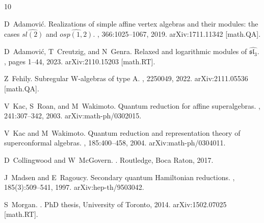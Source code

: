\documentclass[10pt,a4paper]{amsart}
\numberwithin{equation}{section}
\theoremstyle{plain}
\begin{document}


%
%


\raggedright
% 
% 
\providecommand{\opp}[2]{\textsf{arXiv:\mbox{#2}/#1}}\providecommand{\pp}[2]{\textsf{arXiv:#1
  [\mbox{#2}]}}
\begin{thebibliography}{10}

D~Adamovi\'{c}.
\newblock Realizations of simple affine vertex algebras and their modules: the
  cases $\widehat{sl(2)}$ and $\widehat{osp(1,2)}$.
, 366:1025--1067, 2019.
\newblock \pp{1711.11342}{math.QA}.

D~Adamovi\'{c}, T~Creutzig, and N~Genra.
\newblock Relaxed and logarithmic modules of $\widehat{\mathfrak{sl}_3}$.
, pages 1--44, 2023.
\newblock \pp{2110.15203}{math.RT}.

Z~Fehily.
\newblock Subregular {W}-algebras of type {A}.
, 2250049, 2022.
\newblock \pp{2111.05536}{math.QA}.

V~Kac, S~Roan, and M~Wakimoto.
\newblock Quantum reduction for affine superalgebras.
, 241:307--342, 2003.
\newblock \opp{0302015}{math-ph}.

V~Kac and M~Wakimoto.
\newblock Quantum reduction and representation theory of superconformal
  algebras.
, 185:400--458, 2004.
\newblock \opp{0304011}{math-ph}.

D~Collingwood and W~McGovern.
.
\newblock Routledge, Boca Raton, 2017.

J~Madsen and E~Ragoucy.
\newblock Secondary quantum {H}amiltonian reductions.
, 185(3):509--541, 1997.
\newblock \opp{9503042}{hep-th}.

S~Morgan.
.
\newblock PhD thesis, University of Toronto, 2014.
\newblock \pp{1502.07025}{math.RT}.


\end{thebibliography}
\end{document}
